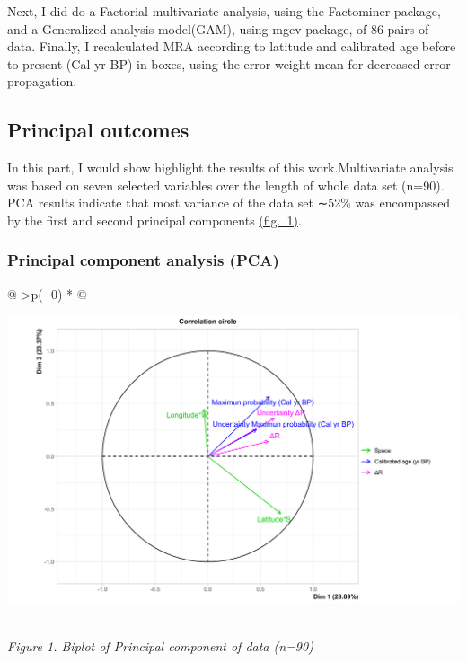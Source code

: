 \documentclass[
]{article}
\begin{document}
Next, I did do a Factorial multivariate analysis, using the Factominer
package, and a Generalized analysis model(GAM), using mgcv package, of
86 pairs of data. Finally, I recalculated MRA according to latitude and
calibrated age before to present (Cal yr BP) in boxes, using the error
weight mean for decreased error propagation.

\hypertarget{principal-outcomes}{%
\subsection{Principal outcomes}\label{principal-outcomes}}

In this part, I would show highlight the results of this
work.Multivariate analysis was based on seven selected variables over
the length of whole data set (n=90). PCA results indicate that most
variance of the data set ∼52\% was encompassed by the first and second
principal components
\protect\hyperlink{principal-component-analysis-ux28pcaux29}{(fig.~1)}.

\hypertarget{principal-component-analysis-pca}{%
\subsubsection{Principal component analysis
(PCA)}\label{principal-component-analysis-pca}}

\begin{longtable}[]{@{}
  >{\centering\arraybackslash}p{(\columnwidth - 0\tabcolsep) * }@{}}
\toprule
\begin{minipage}[b]{\linewidth}\centering
\href{https://github.com/jasb3110/Radiocarbon-reservoir/blob/db842ff0620d55ea5ca5ceec0d96a369406b6e3c/AMV.biplot.png?raw=true}{\includegraphics{AMV.biplot.png}}
\end{minipage} \\
\midrule
\endhead
\emph{Figure 1. Biplot of Principal component of data (n=90)} \\
\bottomrule
\end{longtable}
\end{document}
